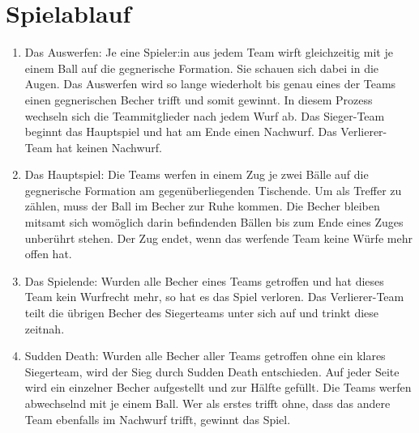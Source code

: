 \section{Spielablauf}\label{Bier-Pong:Spielablauf}
\begin{enumerate}[label={(\arabic*)}]
    \item
    Das Auswerfen: Je eine Spieler:in aus jedem Team wirft gleichzeitig mit je einem Ball auf die gegnerische Formation.
    Sie schauen sich dabei in die Augen. Das Auswerfen wird so lange wiederholt bis genau eines der Teams einen gegnerischen Becher trifft und somit gewinnt.
    In diesem Prozess wechseln sich die Teammitglieder nach jedem Wurf ab.
    Das Sieger-Team beginnt das Hauptspiel und hat am Ende einen Nachwurf.
    Das Verlierer-Team hat keinen Nachwurf.

    \item
    Das Hauptspiel: Die Teams werfen in einem Zug je zwei Bälle auf die gegnerische Formation am gegenüberliegenden Tischende.
    Um als Treffer zu zählen, muss der Ball im Becher zur Ruhe kommen.
    Die Becher bleiben mitsamt sich womöglich darin befindenden Bällen bis zum Ende eines Zuges unberührt stehen.
    Der Zug endet, wenn das werfende Team keine Würfe mehr offen hat.

    \item
    Das Spielende: Wurden alle Becher eines Teams getroffen und hat dieses Team kein Wurfrecht mehr, so hat es das Spiel verloren.
    Das Verlierer-Team teilt die übrigen Becher des Siegerteams unter sich auf und trinkt diese zeitnah.

    \item
    \glqq{}Sudden Death\grqq{}: Wurden alle Becher aller Teams getroffen ohne ein klares Siegerteam, wird der Sieg durch Sudden Death entschieden.
    Auf jeder Seite wird ein einzelner Becher aufgestellt und zur Hälfte gefüllt.
    Die Teams werfen abwechselnd mit je einem Ball.
    Wer als erstes trifft ohne, dass das andere Team ebenfalls im Nachwurf trifft, gewinnt das Spiel.
\end{enumerate}
    
